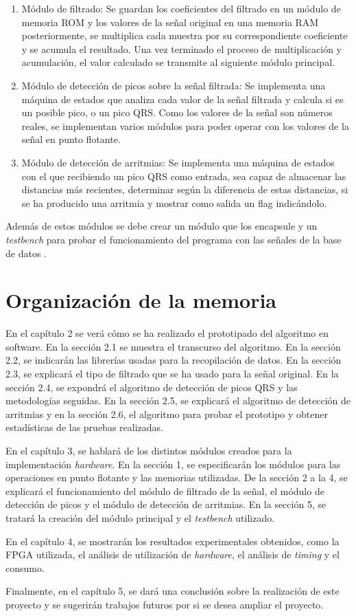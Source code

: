 	\begin{enumerate}
		\item Módulo de filtrado: Se guardan los coeficientes del filtrado en un módulo de memoria ROM y los valores de la señal original en una memoria RAM posteriormente, se multiplica cada muestra por su correspondiente coeficiente y se acumula el resultado. Una vez terminado el proceso de multiplicación y acumulación, el valor calculado se transmite al siguiente módulo principal.
		\item Módulo de detección de picos sobre la señal filtrada: Se implementa una máquina de estados que analiza cada valor de la señal filtrada y calcula si es un posible pico, o un pico QRS. Como los valores de la señal son números reales, se implementan varios módulos para poder operar con los valores de la señal en punto flotante. 
		\item Módulo de detección de arritmias: Se implementa una máquina de estados con el que recibiendo un pico QRS como entrada, sea capaz de almacenar las distancias más recientes, determinar según la diferencia de estas distancias, si se ha producido una arritmia y mostrar como salida un flag indicándolo.
	\end{enumerate}
	
	Además de estos módulos se debe crear un módulo que los encapsule y un \textit{testbench} para probar el funcionamiento del programa con las señales de la base de datos \cite{desai2021low}.

\section{Organización de la memoria}
En el capítulo 2 se verá cómo se ha realizado el prototipado del algoritmo en software. En la sección 2.1 se muestra el transcurso del algoritmo. En la sección 2.2, se indicarán las librerías usadas para la recopilación de datos. En la sección 2.3, se explicará el tipo de filtrado que se ha usado para la señal original. En la sección 2.4, se expondrá el algoritmo de detección de picos QRS y las metodologías seguidas. En la sección 2.5, se explicará el algoritmo de detección de arritmias y en la sección 2.6, el algoritmo para probar el prototipo y obtener estadísticas de las pruebas realizadas.

En el capítulo 3, se hablará de los distintos módulos creados para la implementación  \textit{hardware}. En la sección 1, se especificarán los módulos para las operaciones en punto flotante y las memorias utilizadas. De la sección 2 a la 4, se explicará el funcionamiento del módulo de filtrado de la señal, el módulo de detección de picos y el módulo de detección de arritmias. En la sección 5, se tratará la creación del módulo principal y el \textit{testbench} utilizado.

En el capítulo 4, se mostrarán los resultados experimentales obtenidos, como la FPGA utilizada, el análisis de utilización de  \textit{hardware}, el análisis de  \textit{timing} y el consumo.

Finalmente, en el capítulo 5, se dará una conclusión sobre la realización de este proyecto y se sugerirán trabajos futuros por si se desea ampliar el proyecto.
